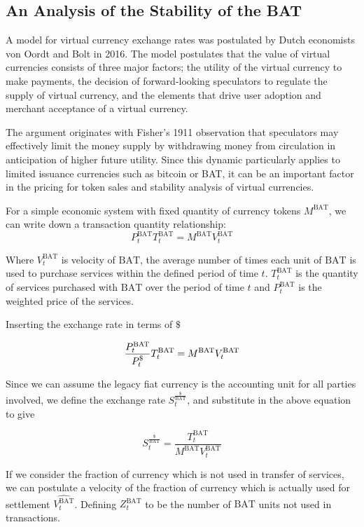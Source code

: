 \documentclass[11pt]{article}
\begin{document}
\subsection{An Analysis of the Stability of the \textrm{BAT}}
\label{sec-8-3}

A model for virtual currency exchange rates was postulated by Dutch
economists von Oordt and Bolt in 2016\cite{22}. The model postulates that the
value of virtual currencies consists of three major factors; the
utility of the virtual currency to make payments, the decision of
forward-looking speculators to regulate the supply of virtual
currency, and the elements that drive user adoption and merchant
acceptance of a virtual currency.   

The argument originates with Fisher's 1911 observation that
speculators may effectively limit the money supply by withdrawing
money from circulation in anticipation of higher future utility. Since
this dynamic particularly applies to limited issuance currencies such
as bitcoin or \textrm{BAT}, it can be an important factor in the pricing for
token sales and stability analysis of virtual currencies.   

For a simple economic system with fixed quantity of currency tokens $M^{\textrm{BAT}}$,
we can write down a transaction quantity relationship: 
\[P^{\textrm{BAT}}_{t} T^{\textrm{BAT}}_{t} = M^{\textrm{BAT}} V^{\textrm{BAT}}_{t} \]


Where $V^{\textrm{BAT}}_{t} $ is velocity of $\textrm{BAT}$, the average number
of times each unit of $\textrm{BAT}$ is used to purchase services within
the defined period of time $t$. $T^{\textrm{BAT}}_{t}$ is the quantity
of services purchased with $\textrm{BAT}$ over the period of time $t$
and $P^{\textrm{BAT}}_{t}$ is the weighted price of the services. 
   
Inserting the exchange rate in terms of $\$$

\[ \frac{P^{\textrm{\textrm{BAT}}}_{t}}{P^{\$}_{t}} T^{\textrm{BAT}}_{t} = M^{\textrm{BAT}} V^{\textrm{BAT}}_{t}\]

Since we can assume the legacy fiat currency is the accounting unit
for all parties involved, we define the exchange rate $S^{\frac{\$}{\textrm{BAT}}}_{t}$, and substitute
in the above equation to give 

 \[S^{\frac{\$}{\textrm{BAT}}}_{t} = \frac{T^{\textrm{BAT}}_{t}}{M^{\textrm{BAT}} V^{\textrm{BAT}}_{t}} \]

If we consider the fraction of currency which is not used in transfer of services, we can postulate a velocity of the fraction of currency which is actually used for settlement $\widehat{V^{\textrm{BAT}}_{t}}$.
Defining $Z^{\textrm{BAT}}_{t}$ to be the number of $\textrm{BAT}$ units not used in transactions.
\end{document}
